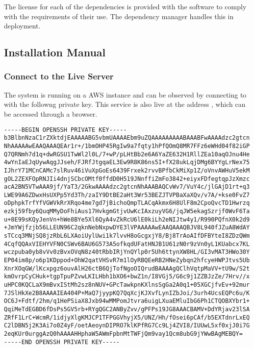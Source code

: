 The license for each of the dependencies is provided with the software to comply with the requirements of their use. The dependency manager  handles this in deployment.

\subsection{Installation Manual}

\subsubsection{Connect to the Live Server}

The system is running on a AWS instance and can be observed by connecting to  with the followng private key. This service is also live at the address , which can be accessed through a browser.

\newpage
\begin{verbatim}
-----BEGIN OPENSSH PRIVATE KEY-----
b3BlbnNzaC1rZXktdjEAAAAABG5vbmUAAAAEbm9uZQAAAAAAAAABAAABFwAAAAdzc2gtcn
NhAAAAAwEAAQAAAQEAr1r+/1bmOHP45RgIw9a7fqty1hPfQOmQ8MR7FFz6eWHd04f82iGP
Q7QRNmh7d1q+dwRGSU1TwWl2l0L/7+wP/pLHtBb2e6A6YaZE632H1RllZEa10aqOJnu4He
4wYnIaEJqUywAqgJJseh/FJRfJtgqaEL3Ew9R8K86ns5I+fX28ukLqjDMg6BYYgLrNex75
IJhrY71MCnCAMc7slRuv46iVuXpGoEs6439Frxek2rvvBPfbCkMiXp1Z/oVnvAWHuV5ekM
gOL2ZEXFOpRNJIi4dnjSCbcOMtf0ffdD0H519JNnffiZmFo3842+eiyxFDfegtqpJzXmzc
acA2BN5VTwAAA9jf/YaT3/2GkwAAAAdzc2gtcnNhAAABAQCvWv7/VuY4c/jlGAjD1rt+q3
LWE99A6ZDwxHsUXPp5Yd3Th/zaIY9DtBE2aHt3Wr53BEZJTVPBaXaXQv/v7A/+kse0FvZ7
oDphpkTrfYfVGWVkRrXRqo4me7gd7jBichoQmpTLACqAkmx6H8UlF8m2CpoQvcTD1Hwrzq
ezkj59fby6QuqMMyDoFhiAus17HvkgmGtjvUwKcIAxzuyVG6/jqJW5ekagSzrjf0WvF6Ta
u+8E99sKQyJenVn+hWe8BYe5Xl6QyA4vZkRcU6lE0kiLh2eNIJtw4y1/R990PQfnX0k2d9
+JmYWjfzjb56LLEUN96C2qknNebNxpwDYE3lVPAAAAAwEAAQAAAQBJV8L940fJZuA8WdAY
sTCcq3MNjSQ8jzRbL6LXAoiUylUwi1k7lvvH8oGcgxjY8/Bj8TrAoAIfDFBYteI8ZDzQWm
4CqfQQAxVIEHYVFN0CSWv6BAU6G573A5ofkqdUFatHNJB1U61zN0r9zVn0yL1KUabcx7KL
wczpuba0yb8vVv0zBvxOVqN8z40tRbbIRjYnQYlp0r5Uh6ttynXW8HL/GI3vMAT3HWo30Y
EP04im8p/o6p1KDppod+OhW2qatVHSvR7m1lOyRBQEeRB2HNeZybqn2hfcyeHWPJtvs5Ub
XnrXOqGW/lKcxpgz6ouvAlH26ctB6QjTofNgoOIQrudBAAAAgQClhVqtpMaVV+tU9w/S2t
kmOvrpCyCHuk+tgpTpuPZvwLKILHbh1bXO6+bwZ1n/I8VGj5/G6c9j1ZZBJzZe/7Hrv//x
uHPC0KQCLaX9mBvxIStMh2sz8nNUV+GPcTawkpnKXlnsSgGa2A0q1+05XGCjfvEv+92mur
7JSlHkXe2B8AAAAIEA404P+MaQ7jyypKQ7QqXcjKJXvfLynIZbJoi/3urh4UcsEQPc6u/K
OC6J+Fdtf/2hm/q1HePSiaX8Jxb94wMMPomJtvra6uigLXuaEMluIbG6Ph1CTQOBXYbr1+
QqiMeTdEGBD6fDsPs5GV5rb+RYgQGC2ANByZvv/gPFPs19JG8AAACBAMV+DdYRjav23lSA
ZRfF1LrC+WcmR/1idjyXlgKMJCP1TFPGGVhyjX5/UNZ/Hh/fOsei6pCAf/b5EXTdnrLxEQ
C2lDBN5j2K3Ai7o0Z4yF/oetAeoynDIPRO7klKPfRG7Cc9Lj4ZVI8/IUUwL5xf0xjJ0i7G
2eqKUr0urggAzQ0hAAAAHHphaW5AWmFpbnMtTWFjQm9vay1Qcm8ubG9jYWwBAgMEBQY=
-----END OPENSSH PRIVATE KEY-----
\end{verbatim}

